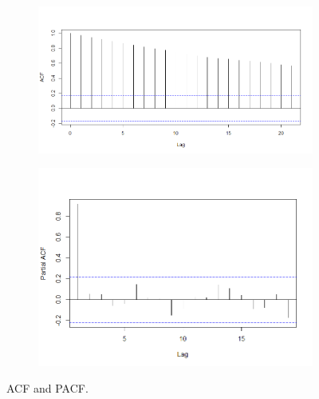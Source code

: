 \documentclass[12pt, centerh1]{article}
\begin{document}
\begin{figure}
     \centering
     \begin{subfigure}[b]{0.55\textwidth}
         \includegraphics[width=1\linewidth]{imgs/acf_open.png}
         \caption{}
         \label{fig:acf_open}
     \end{subfigure}
     
     \begin{subfigure}[b]{0.55\textwidth}
         \includegraphics[width=1\linewidth]{imgs/pacf_open.png}
         \caption{}
         \label{fig:pacf_open}
     \end{subfigure}
     \caption{ACF and PACF.}
\end{figure}
\end{document}
